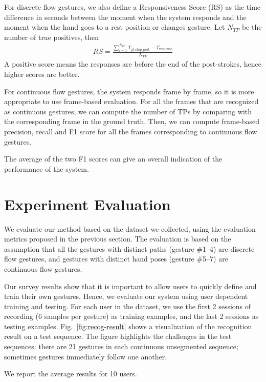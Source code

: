 \documentclass[conference]{IEEEtran}
\begin{document}
For discrete flow gestures, we also define a Responsiveness Score (RS) as the
time difference in seconds between the moment when the system responds and the moment when the hand goes to a rest
position or changes gesture. Let $N_{TP}$ be the number of true positives, then
\begin{align}
RS = \frac{\sum_{i = 1}^{N_{TP}}T_{{\text{gt\_stop\_post}}} -
T_{\text{response}}}{N_{TP}}
\end{align}
A positive score means the responses are before the end of the post-strokes,
hence higher scores are better.

For continuous flow gestures, the system responds frame by frame,
so it is more appropriate to use frame-based evaluation. For all the frames that are
recognized as continuous gestures, we can compute the number of TPs by
comparing with the corresponding frame in the ground truth. Then, we can
compute frame-based precision, recall and F1 score for all the frames
corresponding to continuous flow gestures.

The average of the two F1 scores can give an overall indication of the
performance of the system.

\section{Experiment Evaluation}\label{sec:evaluation}
We evaluate our method based on the dataset we collected, using the
evaluation metrics proposed in the previous section. The evaluation is based
on the assumption that all the gestures with distinct paths (gesture \#1--4)
are discrete flow gestures, and gestures with distinct hand poses (gesture
\#5--7) are continuous flow gestures. 

Our survey results show that it is
important to allow users to quickly define and train their own gestures. Hence,
we evaluate our system using user dependent training and testing. For each user
in the dataset, we use the first 2 sessions of recording (6 samples per gesture)
as training examples, and the last 2 sessions as testing examples.
Fig.~\ref{fig:recog-result} shows a visualization of the recognition result on a
test sequence. The figure highlights the challenges in the test sequences:
there are 21 gestures in each continuous unsegmented sequence; sometimes
gestures immediately follow one another.

We report the average results for 10 users.
\end{document}
